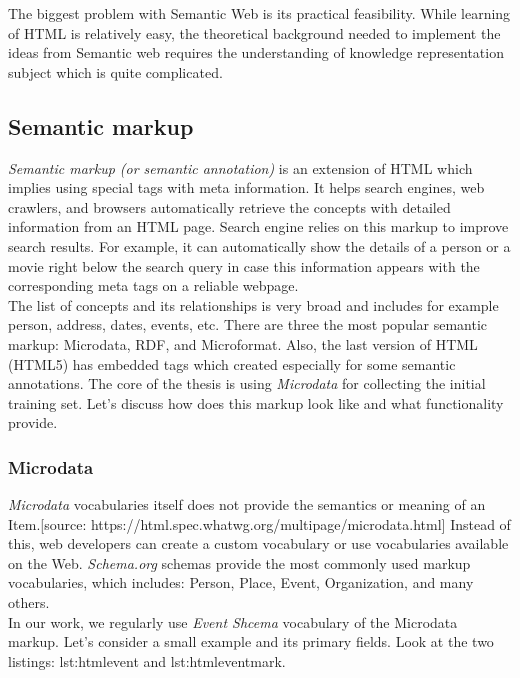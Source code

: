 The biggest problem with Semantic Web is its practical feasibility. While learning of HTML is relatively easy, the theoretical background needed to implement the ideas from Semantic web requires the understanding of knowledge representation subject which is quite complicated. 

\subsection{Semantic markup}
\textit{Semantic markup (or semantic annotation)} is an extension of HTML which implies using special tags with meta information. It helps search engines, web crawlers, and browsers automatically retrieve the concepts with detailed information from an HTML page. Search engine relies on this markup to improve search results. For example, it can automatically show the details of a person or a movie right below the search query in case this information appears with the corresponding meta tags on a reliable webpage.\\ 

The list of concepts and its relationships is very broad and includes for example person, address, dates, events, etc. There are three the most popular semantic markup: Microdata, RDF, and Microformat. Also, the last version of HTML (HTML5) has embedded tags which created especially for some semantic annotations. The core of the thesis is using \textit{Microdata} for collecting the initial training set. Let's discuss how does this markup look like and what functionality provide.\\

\subsubsection*{Microdata}
\label{subsubsec:microdata}
\textit{Microdata} vocabularies itself does not provide the semantics or meaning of an Item.[source: https://html.spec.whatwg.org/multipage/microdata.html] Instead of this, web developers can create a custom vocabulary or use vocabularies available on the Web. \textit{Schema.org} schemas provide the most commonly used markup vocabularies, which includes: Person, Place, Event, Organization, and many others. \\

In our work, we regularly use \textit{Event Shcema} vocabulary of the Microdata markup. Let's consider a small example and its primary fields. Look at the two listings: {lst:htmlevent} and {lst:htmleventmark}.\\

